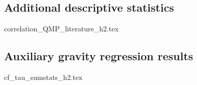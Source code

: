 \documentclass[12pt,a4paper,oneside,times]{article}   	%
\newcommand{\tablespath}{{"C:/Users/dhill/Dropbox/Dissertation"}}
\DeclareMathOperator{\MP}{QMP}
\begin{document}
\subsection{Additional descriptive statistics}
\begin{table}[H]\centering
\caption{Correlation table between quality market potential and alternatives from the literature}\label{t: corr FQMP lit}
{correlation_QMP_literature_h2.tex}
\end{table}


\subsection{Auxiliary gravity regression results}

\begin{table}[H]\centering
\caption{Coefficient estimates of auxiliary regression\label{t: coeff sumstats}}
{cf_tau_sumstats_h2.tex}
\end{table}



%
%
%
%
\end{document}
